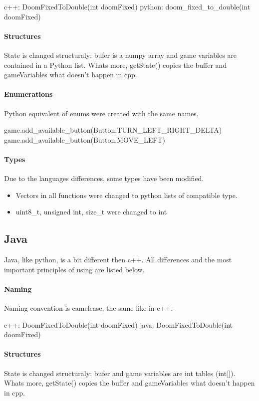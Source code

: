 \begin{cblock}
c++: DoomFixedToDouble(int doomFixed)
python: doom_fixed_to_double(int doomFixed)
\end{cblock}


\paragraph {Structures}
 State is changed structuraly: bufer is a numpy array and game variables are contained in a Python list. Whats more, getState() copies the buffer and gameVariables what doesn't happen in cpp. 
\paragraph {Enumerations}
Python equivalent of enums were created with the same names.
\begin{cblock}
game.add_available_button(Button.TURN_LEFT_RIGHT_DELTA)
game.add_available_button(Button.MOVE_LEFT)
\end{cblock}
\paragraph {Types}
Due to the languages differences, some types have been modified.
\begin{itemize} 
\item Vectors in all functions were changed to python lists of compatible type.

\item  uint8\_t, unsigned int, size\_t were changed to int
\end{itemize}



\subsection{Java}
Java, like python, is a bit different then c++. All differences and the most important principles of using are listed below.

\paragraph {Naming}
 Naming convention is camelcase, the same like in c++. 
\begin{cblock}
c++: DoomFixedToDouble(int doomFixed)
java: DoomFixedToDouble(int doomFixed)
\end{cblock}
\paragraph {Structures}
State is changed structuraly: bufer and game variables are int tables (int[]). Whats more, getState() copies the buffer and gameVariables what doesn't happen in cpp. 
